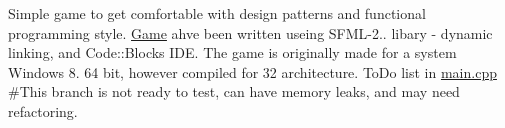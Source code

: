 Simple game to get comfortable with design patterns and functional programming style. \hyperlink{class_game}{Game} ahve been written useing S\+F\+M\+L-\/2.. libary -\/ dynamic linking, and Code\+::\+Blocks I\+D\+E. The game is originally made for a system Windows 8. 64 bit, however compiled for 32 architecture. To\+Do list in \hyperlink{main_8cpp}{main.\+cpp} \#\+This branch is not ready to test, can have memory leaks, and may need refactoring. 